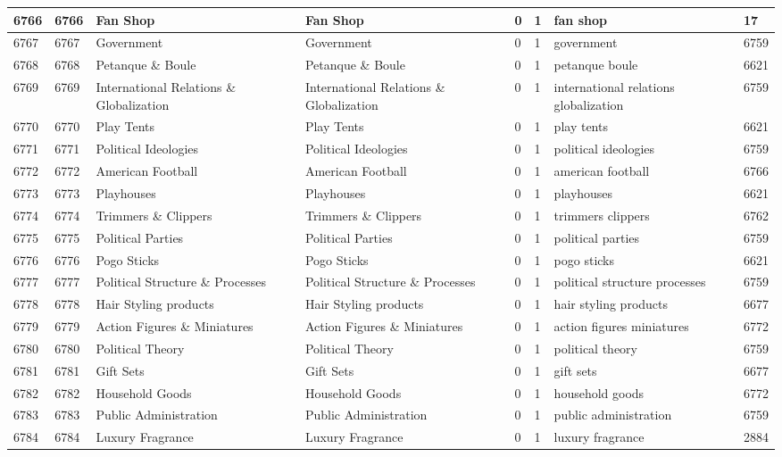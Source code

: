 \begin{longtable}{|l|l|l|l|l|l|l|l|}
6766 & 6766 & Fan Shop & Fan Shop & 0 & 1 & fan shop & 17 \\ \hline 
6767 & 6767 & Government & Government & 0 & 1 & government & 6759 \\ \hline 
6768 & 6768 & Petanque \& Boule & Petanque \& Boule & 0 & 1 & petanque boule & 6621 \\ \hline 
6769 & 6769 & International Relations \& Globalization & International Relations \& Globalization & 0 & 1 & international relations globalization & 6759 \\ \hline 
6770 & 6770 & Play Tents & Play Tents & 0 & 1 & play tents & 6621 \\ \hline 
6771 & 6771 & Political Ideologies & Political Ideologies & 0 & 1 & political ideologies & 6759 \\ \hline 
6772 & 6772 & American Football & American Football & 0 & 1 & american football & 6766 \\ \hline 
6773 & 6773 & Playhouses & Playhouses & 0 & 1 & playhouses & 6621 \\ \hline 
6774 & 6774 & Trimmers \& Clippers & Trimmers \& Clippers & 0 & 1 & trimmers clippers & 6762 \\ \hline 
6775 & 6775 & Political Parties & Political Parties & 0 & 1 & political parties & 6759 \\ \hline 
6776 & 6776 & Pogo Sticks & Pogo Sticks & 0 & 1 & pogo sticks & 6621 \\ \hline 
6777 & 6777 & Political Structure \& Processes & Political Structure \& Processes & 0 & 1 & political structure processes & 6759 \\ \hline 
6778 & 6778 & Hair Styling products & Hair Styling products & 0 & 1 & hair styling products & 6677 \\ \hline 
6779 & 6779 & Action Figures \& Miniatures & Action Figures \& Miniatures & 0 & 1 & action figures miniatures & 6772 \\ \hline 
6780 & 6780 & Political Theory & Political Theory & 0 & 1 & political theory & 6759 \\ \hline 
6781 & 6781 & Gift Sets & Gift Sets & 0 & 1 & gift sets & 6677 \\ \hline 
6782 & 6782 & Household Goods & Household Goods & 0 & 1 & household goods & 6772 \\ \hline 
6783 & 6783 & Public Administration & Public Administration & 0 & 1 & public administration & 6759 \\ \hline 
6784 & 6784 & Luxury Fragrance & Luxury Fragrance & 0 & 1 & luxury fragrance & 2884 \\ \hline 

\end{longtable}
